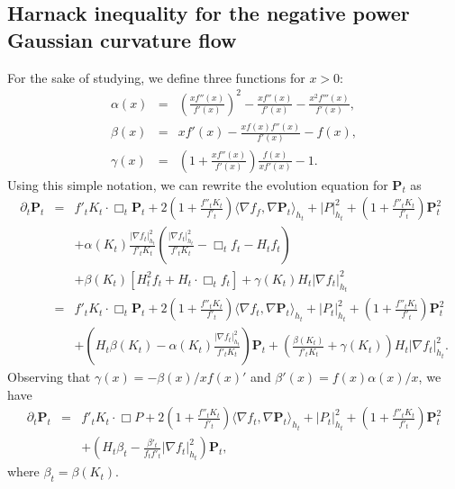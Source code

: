 \documentclass{amsart}
\theoremstyle{definition}
\theoremstyle{remark}
\numberwithin{equation}{section}
\begin{document}
\subsection{Harnack inequality for the negative power Gaussian curvature flow}
For the sake of studying, we define three functions for $x>0$:
\begin{eqnarray}
\alpha(x)&=&\left(\frac{xf''(x)}{f'(x)}\right)^{2}-\frac{xf''(x)}{f'(x)}
-\frac{x^{2}f'''(x)}{f'(x)},\label{3.12}\\
\beta(x)&=&xf'(x)-\frac{xf(x)f''(x)}{f'(x)}-f(x),\label{3.13}\\
\gamma(x)&=&\left(1+\frac{xf''(x)}{f'(x)}\right)\frac{f(x)}{xf'(x)}-1.\label{3.13}
\end{eqnarray}
Using this simple notation, we can rewrite the evolution equation for $\mathbf{P}_{t}$ as
\begin{eqnarray*}
\partial_{t}\mathbf{P}_{t}&=&f'_{t}K_{t}\cdot\Box_{t} \mathbf{P}_{t}+2\left(1+\frac{f''_{t}K_{t}}{f'_{t}}\right)\langle\nabla f_{f},
\nabla\mathbf{P}_{t}\rangle_{h_{t}}
+|P|^{2}_{h_{t}}+\left(1+\frac{f''_{t}K_{t}}{f'_{t}}\right)\mathbf{P}^{2}_{t}\\
&&+\alpha(K_{t})\frac{|\nabla f_{t}|^{2}_{h_{t}}}{f'_{t}K_{t}}
\left(\frac{|\nabla f_{t}|^{2}_{h_{t}}}{f'_{t}K_{t}}-\Box_{t} f_{t}-H_{t}f_{t}
\right)\\
&&+\beta(K_{t})\left[H^{2}_{t}f_{t}+H_{t}\cdot\Box_{t} f_{t}\right]
+\gamma(K_{t})H_{t}|\nabla f_{t}|^{2}_{h_{t}}\\
&=&f'_{t}K_{t}\cdot\Box_{t}\mathbf{P}_{t}+2\left(1+\frac{f''_{t}K_{t}}{f'_{t}}
\right)\langle\nabla f_{t},\nabla \mathbf{P}_{t}\rangle_{h_{t}}
+|P_{t}|^{2}_{h_{t}}+\left(1+\frac{f''_{t}K_{t}}{f'_{t}}\right)\mathbf{P}^{2}_{t}\\
&&+\left(H_{t}\beta(K_{t})-\alpha(K_{t})\frac{|\nabla f_{t}|^{2}_{h_{t}}}{f'_{t}K_{t}}\right)\mathbf{P}_{t}+
\left(\frac{\beta(K_{t})}{f'_{t}K_{t}}+\gamma(K_{t})\right)H_{t}|\nabla f_{t}|^{2}_{h_{t}}.
\end{eqnarray*}
Observing that $\gamma(x)=-\beta(x)/xf(x)'$ and $\beta'(x)=f(x)\alpha(x)/x$, we have
\begin{eqnarray}
\partial_{t}\mathbf{P}_{t}&=&f'_{t}K_{t}\cdot\Box P+2\left(1+\frac{f''_{t}K_{t}}{f'_{t}}\right)\langle\nabla f_{t},
\nabla \mathbf{P}_{t}\rangle_{h_{t}}
+|P_{t}|^{2}_{h_{t}}+\left(1+\frac{f''_{t}K_{t}}{f'_{t}}\right)\mathbf{P}^{2}_{t}\nonumber\\
&&+\left(H_{t}\beta_{t}-\frac{\beta'_{t}}{f_{t}f'_{t}}|\nabla f_{t}|^{2}_{h_{t}}\right)\mathbf{P}_{t},\label{3.15}
\end{eqnarray}
where $\beta_{t}=\beta(K_{t})$.
\end{document}
